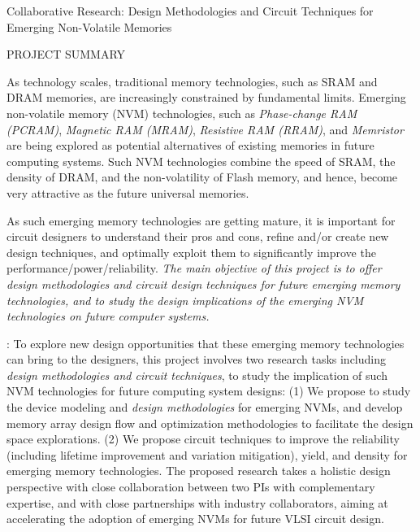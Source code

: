 \documentclass[11pt,letterpaper]{article}
\begin{document}
\begin{center}
{\Large Collaborative Research: Design Methodologies and Circuit Techniques for Emerging Non-Volatile Memories}\\
\end{center}
\begin{center}
{\large  PROJECT SUMMARY} \\
\end{center}

\normalsize
As technology scales, traditional memory technologies, such as SRAM and DRAM memories, are increasingly constrained by fundamental limits. Emerging non-volatile memory (NVM) technologies, such as \textit{Phase-change RAM (PCRAM)}, \textit{Magnetic RAM (MRAM)},  \textit{Resistive RAM (RRAM)}, and \textit{Memristor} are being explored as potential alternatives of existing memories in future computing systems. Such NVM technologies combine the speed of SRAM, the density of DRAM, and the non-volatility of Flash memory, and hence, become very attractive as the future universal memories. 

As such emerging memory technologies are getting mature, it is important for circuit designers to understand their pros and cons, refine and/or create new design techniques, and optimally exploit them to significantly improve the performance/power/reliability. \textit{The main objective of this project is to offer design methodologies and circuit design techniques for future emerging memory technologies, and to study the design implications of the emerging NVM technologies on future computer systems.}

{}: 
To explore new design opportunities that these emerging memory technologies can bring to the designers,  this project involves two research tasks including \emph{design methodologies and circuit techniques}, to study the implication of such NVM technologies for future computing system designs: (1) We propose to study the device modeling and \textit{design methodologies} for emerging NVMs, and develop memory array design flow and optimization methodologies to facilitate the design space explorations. (2) We propose circuit techniques to improve the reliability (including lifetime improvement and variation mitigation), yield,
and density for emerging memory technologies. The proposed research takes a holistic design perspective with close collaboration between two PIs with complementary expertise, and with close partnerships with industry collaborators, aiming at accelerating the adoption of emerging NVMs for future VLSI circuit design.
\end{document}
